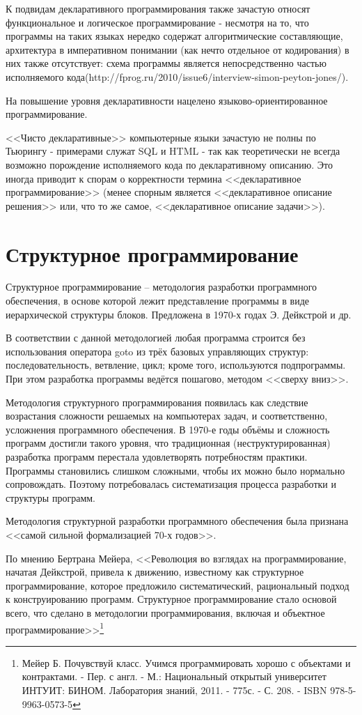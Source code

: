 \documentclass[12pt, twoside]{report}
\begin{document}
К подвидам декларативного программирования также зачастую относят функциональное и логическое программирование - несмотря на то, что программы на таких языках нередко содержат алгоритмические составляющие, архитектура в императивном понимании (как нечто отдельное от кодирования) в них также отсутствует: схема программы является непосредственно частью исполняемого кода(http://fprog.ru/2010/issue6/interview-simon-peyton-jones/).

На повышение уровня декларативности нацелено языково-ориентированное программирование.

<<Чисто декларативные>> компьютерные языки зачастую не полны по Тьюрингу - примерами служат SQL и HTML - так как теоретически не всегда возможно порождение исполняемого кода по декларативному описанию. Это иногда приводит к спорам о корректности термина <<декларативное программирование>> (менее спорным является <<декларативное описание решения>> или, что то же самое, <<декларативное описание задачи>>).

\section*{Структурное программирование}

Структурное программирование -- методология разработки программного обеспечения, в основе которой лежит представление программы в виде иерархической структуры блоков. Предложена в 1970-х годах Э. Дейкстрой и др.

В соответствии с данной методологией любая программа строится без использования оператора goto из трёх базовых управляющих структур: последовательность, ветвление, цикл; кроме того, используются подпрограммы. При этом разработка программы ведётся пошагово, методом <<сверху вниз>>.

Методология структурного программирования появилась как следствие возрастания сложности решаемых на компьютерах задач, и соответственно, усложнения программного обеспечения. В 1970-е годы объёмы и сложность программ достигли такого уровня, что традиционная (неструктурированная) разработка программ перестала удовлетворять потребностям практики. Программы становились слишком сложными, чтобы их можно было нормально сопровождать. Поэтому потребовалась систематизация процесса разработки и структуры программ.

Методология структурной разработки программного обеспечения была признана <<самой сильной формализацией 70-х годов>>.

По мнению Бертрана Мейера, <<Революция во взглядах на программирование, начатая Дейкстрой, привела к движению, известному как структурное программирование, которое предложило систематический, рациональный подход к конструированию программ. Структурное программирование стало основой всего, что сделано в методологии программирования, включая и объектное программирование>>\footnote{Мейер Б. Почувствуй класс. Учимся программировать хорошо с объектами и контрактами. - Пер. с англ. - М.: Национальный открытый университет ИНТУИТ: БИНОМ. Лаборатория знаний, 2011. - 775с. - С. 208. - ISBN 978-5-9963-0573-5}
\end{document}
